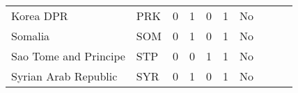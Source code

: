 \begin{longtable}{l l c c c c c c c c}
Korea DPR                  & PRK           & 0          & 1                   & 0         & 1                 & No              \\
Somalia                    & SOM           & 0          & 1                   & 0         & 1                 & No              \\
Sao Tome and Principe      & STP           & 0          & 0                   & 1         & 1                 & No              \\
Syrian Arab Republic       & SYR           & 0          & 1                   & 0         & 1                 & No             
\\ \hline \hline
\end{longtable}
\endgroup
